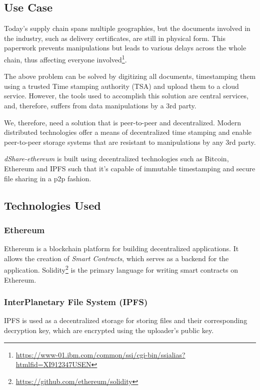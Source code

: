 \subsection{Use Case}
Today's supply chain spans multiple geographies, but the documents involved in the industry, such as delivery certificates, are still in physical form. This paperwork prevents manipulations but leads to various delays across the whole chain, thus affecting everyone involved\footnote{\url{https://www-01.ibm.com/common/ssi/cgi-bin/ssialias?htmlfid=XI912347USEN}}.

The above problem can be solved by digitizing all documents, timestamping them using a trusted Time stamping authority (TSA) and upload them to a cloud service. However, the tools used to accomplish this solution are central services, and, therefore, suffers from data manipulations by a 3rd party.

We, therefore, need a solution that is peer-to-peer and decentralized. Modern distributed technologies offer a means of decentralized time stamping and enable peer-to-peer storage systems that are resistant to manipulations by any 3rd party.

\textit{dShare-ethereum} is built using decentralized technologies such as Bitcoin\cite{nakamoto2008bitcoin}, Ethereum\cite{buterin2014ethereum} and IPFS\cite{benet2014ipfs} such that it's capable of immutable timestamping and secure file sharing in a p2p fashion.

\subsection{Technologies Used}
\subsubsection{Ethereum}
Ethereum\cite{buterin2014ethereum} is a blockchain platform for building decentralized applications. It allows the creation of \textit{Smart Contracts}, which serves as a backend for the application. Solidity\footnote{\url{https://github.com/ethereum/solidity}} is the primary language for writing smart contracts on Ethereum.

\subsubsection{InterPlanetary File System (IPFS)}
IPFS is used as a decentralized storage for storing files and their corresponding decryption key, which are encrypted using the uploader's public key.

